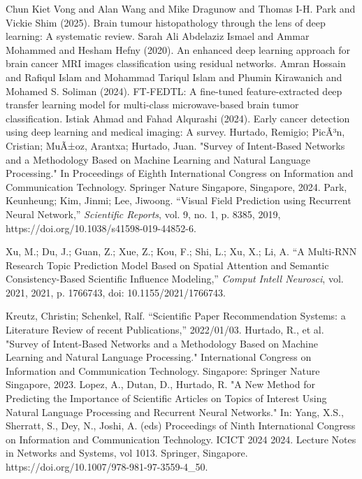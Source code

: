 \documentclass[runningheads]{llncs}
\begin{document}
\begin{thebibliography}{00}
     Chun Kiet Vong and Alan Wang and Mike Dragunow and Thomas I-H. Park and Vickie Shim (2025). Brain tumour histopathology through the lens of deep learning: A systematic review.
 Sarah Ali {Abdelaziz Ismael} and Ammar Mohammed and Hesham Hefny (2020). An enhanced deep learning approach for brain cancer MRI images classification using residual networks.
 Amran Hossain and Rafiqul Islam and Mohammad Tariqul Islam and Phumin Kirawanich and Mohamed S. Soliman (2024). FT-FEDTL: A fine-tuned feature-extracted deep transfer learning model for multi-class microwave-based brain tumor classification.
 Istiak Ahmad and Fahad Alqurashi (2024). Early cancer detection using deep learning and medical imaging: A survey.
    Hurtado, Remigio; PicÃ³n, Cristian; MuÃ±oz, Arantxa; Hurtado, Juan.
    "Survey of Intent-Based Networks and a Methodology Based on Machine Learning and Natural Language Processing."
    In Proceedings of Eighth International Congress on Information and Communication Technology.
    Springer Nature Singapore, Singapore, 2024.
    Park, Keunheung; Kim, Jinmi; Lee, Jiwoong. 
    ``Visual Field Prediction using Recurrent Neural Network,'' 
    \emph{Scientific Reports}, 
    vol. 9, no. 1, p. 8385, 
    2019, 
    https://doi.org/10.1038/s41598-019-44852-6.
    
    Xu, M.; Du, J.; Guan, Z.; Xue, Z.; Kou, F.; Shi, L.; Xu, X.; Li, A. 
    ``A Multi-RNN Research Topic Prediction Model Based on Spatial Attention and Semantic Consistency-Based Scientific Influence Modeling,'' 
    \emph{Comput Intell Neurosci}, 
    vol. 2021, 
    2021, 
    p. 1766743, 
    doi: 10.1155/2021/1766743.
    
    Kreutz, Christin; Schenkel, Ralf.
    ``Scientific Paper Recommendation Systems: a Literature Review of recent Publications,''
    2022/01/03.
	 Hurtado, R., et al. "Survey of Intent-Based Networks and a Methodology Based on Machine Learning and Natural Language Processing." International Congress on Information and Communication Technology. Singapore: Springer Nature Singapore, 2023.
     Lopez, A., Dutan, D., Hurtado, R. "A New Method for Predicting the Importance of Scientific Articles on Topics of Interest Using Natural Language Processing and Recurrent Neural Networks." In: Yang, X.S., Sherratt, S., Dey, N., Joshi, A. (eds) Proceedings of Ninth International Congress on Information and Communication Technology. ICICT 2024 2024. Lecture Notes in Networks and Systems, vol 1013. Springer, Singapore. https://doi.org/10.1007/978-981-97-3559-4\_50.
\end{thebibliography}
\end{document}
